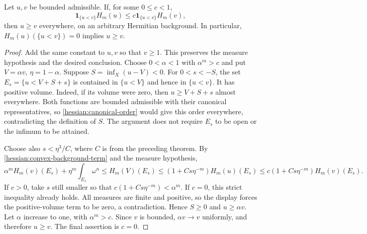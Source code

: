 \begin{theorem}\label{draft637:strict-domination}
Let $u,v$ be bounded admissible. If, for some $0\leq c<1$,
\[
 \mathbf1_{\{u<v\}}H_m(u)
                  \leq c\mathbf1_{\{u<v\}}H_m(v),
\]
then $u\geq v$ everywhere, on an arbitrary Hermitian background.
In particular, $H_m(u)(\{u<v\})=0$ implies $u\geq v$.
\end{theorem}
\begin{proof}
Add the same constant to $u,v$ so that $v\geq1$.
This preserves the measure hypothesis and the desired conclusion.
Choose $0<\alpha<1$ with $\alpha^m>c$ and put $V=\alpha v$,
$\eta=1-\alpha$. Suppose $S=\inf_X(u-V)<0$.
For $0<s<-S$, the set $E_s=\{u<V+S+s\}$ is contained in
$\{u<V\}$ and hence in $\{u<v\}$.
It has positive volume. Indeed, if its volume were zero, then
$u\geq V+S+s$ almost everywhere. Both functions are bounded
admissible with their canonical representatives, so
\cref{hessian:canonical-order} would give this order everywhere,
contradicting the definition of $S$. The argument does not require
$E_s$ to be open or the infimum to be attained.

Choose also $s<\eta^3/C$, where $C$ is from the preceding theorem.
By \cref{hessian:convex-background-term} and the measure hypothesis,
\[
 \alpha^m H_m(v)(E_s)+\eta^m\int_{E_s}\omega^n
 \leq H_m(V)(E_s)
 \leq(1+Cs\eta^{-m})H_m(u)(E_s)
 \leq c(1+Cs\eta^{-m})H_m(v)(E_s).
\]
If $c>0$, take $s$ still smaller so that
$c(1+Cs\eta^{-m})<\alpha^m$. If $c=0$, this strict inequality
already holds. All measures are finite and positive, so the
display forces the positive-volume term to be zero, a contradiction.
Hence $S\geq0$ and $u\geq\alpha v$. Let $\alpha$ increase
to one, with $\alpha^m>c$. Since $v$ is bounded, $\alpha v\to v$
uniformly, and therefore $u\geq v$. The final assertion is $c=0$.
\end{proof}

